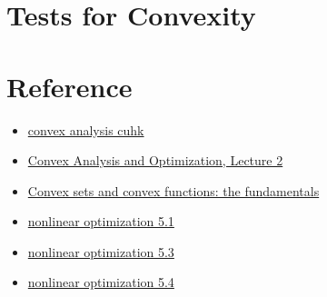\section{Tests for Convexity}

\section{Reference}
\begin{itemize}
    \item \href{https://www.math.cuhk.edu.hk/course_builder/1920/math4230/}{convex analysis cuhk}
    \item \href{https://ocw.mit.edu/courses/6-253-convex-analysis-and-optimization-spring-2012/resources/mit6_253s12_lec02/}{Convex Analysis and Optimization, Lecture 2}
    \item \href{https://link.springer.com/content/pdf/10.1007/0-387-31082-7_1.pdf}{Convex sets and convex functions:
    the fundamentals}
    \item \href{https://sites.math.washington.edu/~burke/crs/408/notes/Math408_W2020/math408text.pdf}{nonlinear optimization 5.1}
    \item \href{https://sites.math.washington.edu/~burke/crs/408/notes/Math408_W2020/math408text.pdf}{nonlinear optimization 5.3}
    \item \href{https://sites.math.washington.edu/~burke/crs/408/notes/Math408_W2020/math408text.pdf}{nonlinear optimization 5.4}
\end{itemize}
